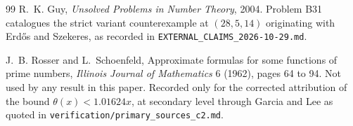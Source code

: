 \documentclass[11pt]{article}
\theoremstyle{remark}
\begin{document}
\begin{thebibliography}{99}
R.~K. Guy,
\emph{Unsolved Problems in Number Theory}, 2004.
Problem B31 catalogues the strict variant counterexample at $(28,5,14)$ originating with Erd\H{o}s and Szekeres, as recorded in \texttt{EXTERNAL\_CLAIMS\_2026-10-29.md}.

J.~B. Rosser and L.~Schoenfeld,
Approximate formulas for some functions of prime numbers,
\emph{Illinois Journal of Mathematics} 6 (1962), pages 64 to 94.
Not used by any result in this paper. Recorded only for the corrected attribution of the bound $\theta(x)<1.01624x$, at secondary level through Garcia and Lee as quoted in \texttt{verification/primary\_sources\_c2.md}.

\end{thebibliography}
\end{document}
